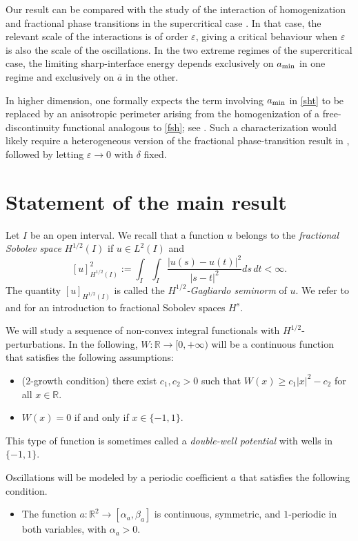 \documentclass[12pt]{article}
\newcommand{\R}{\mathbb{R}}
\numberwithin{equation}{section}
\def\e{\varepsilon}
\def\R{\mathbb R}
\begin{document}
Our result can be compared with the study of the interaction of homogenization and fractional phase transitions in the supercritical case \cite{CarScaVog}. In that case, the relevant scale of the interactions is of order $\varepsilon$, giving a critical behaviour when $\varepsilon$ is also the scale of the oscillations. In the two extreme regimes of the supercritical case, the limiting sharp-interface energy depends exclusively on $a_{\rm min}$ in one regime and exclusively on $\overline a$ in the other.

In higher dimension, one formally expects the term involving $a_{\rm min}$
 in \eqref{sht} to be replaced by an anisotropic perimeter arising from the homogenization of a free-discontinuity functional analogous to \eqref{fsh}; see \cite{AmBra,BMS}. Such a characterization would likely require a heterogeneous version of the fractional phase-transition result in \cite{SV}, followed by letting $\e\to 0$ with $\delta$ fixed.


\section{Statement of the main result}
Let $I$ be an open interval. We recall that a function $u$ belongs to the {\em fractional Sobolev space} $H^{1/2}(I)$ if $u \in L^{2}(I)$ and
\[
[u]_{H^{1/2}(I)}^{2} := \int_{I}\int_{I}
\frac{|u(s)-u(t)|^2}{|s-t|^2} ds\,dt < \infty.
\]
The quantity $[u]_{H^{1/2}(I)}$ is called the {\em$H^{1/2}$-Gagliardo seminorm} of $u$. We refer to \cite{leofrac} and \cite{Hitchhiker} for an introduction to fractional Sobolev spaces $H^s$.


\smallskip
We will study a sequence of non-convex integral functionals with $H^{1/2}$-per\-tur\-ba\-tions. 
In the following,  $W:\R\to[0,+\infty)$ will be a continuous function that satisfies the following assumptions:
\begin{itemize}
    \item [(A1)] ($2$-growth condition) there exist $c_1,c_2>0$ such that
    $W(x)\geq c_1\left|x\right|^2-c_2$ for all $x\in\mathbb R$.
    \item [(A2)] $W(x)=0$ if and only if $x\in\{-1,1\}$. 
\end{itemize}
This type of function is sometimes called a {\em double-well potential} with wells in $\{-1,1\}$.

Oscillations will be modeled by a periodic coefficient $a$ that satisfies the following condition.

\begin{itemize}
    \item [(A3)] The function $a:\R^{2}\to[\alpha_{a},\beta_{a}]$ is continuous, symmetric, and $1$-periodic in both variables, with $\alpha_{a}>0$.
    \end{itemize}
    
\end{document}
